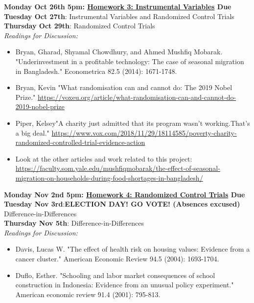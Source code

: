 \documentclass[a4paper, 10pt]{article}
\begin{document}
\noindent\textbf{Monday Oct 26th 5pm: \underline{Homework 3: Instrumental Variables} Due}\\

\noindent\textbf{Tuesday Oct 27th}: Instrumental Variables and Randomized Control Trials\\

\noindent\textbf{Thursday Oct 29th}:  Randomized Control Trials\\
\textit{Readings for Discussion:}
\begin{itemize}

\item Bryan, Gharad, Shyamal Chowdhury, and Ahmed Mushfiq Mobarak. "Underinvestment in a profitable technology: The case of seasonal migration in Bangladesh." Econometrica 82.5 (2014): 1671-1748.
\item Bryan, Kevin "What randomisation can and cannot do: The 2019 Nobel Prize." \href{ https://voxeu.org/article/what-randomisation-can-and-cannot-do-2019-nobel-prize}{ https://voxeu.org/article/what-randomisation-can-and-cannot-do-2019-nobel-prize}
\item Piper, Kelsey"A charity just admitted that its program wasn't working.That's a big deal." \href{ https://www.vox.com/2018/11/29/18114585/poverty-charity-randomized-controlled-trial-evidence-action}{ https://www.vox.com/2018/11/29/18114585/poverty-charity-randomized-controlled-trial-evidence-action}
\item Look at the other articles and work related to this project:\href{ https://faculty.som.yale.edu/mushfiqmobarak/the-effect-of-seasonal-migration-on-households-during-food-shortages-in-bangladesh/}{ https://faculty.som.yale.edu/mushfiqmobarak/the-effect-of-seasonal-migration-on-households-during-food-shortages-in-bangladesh/} 


\end{itemize}

\noindent\textbf{Monday Nov 2nd 5pm: \underline{Homework 4: Randomized Control Trials}  Due}\\

\noindent\textbf{Tuesday Nov 3rd}:\textbf{ELECTION DAY! GO VOTE! (Absences excused)} Difference-in-Differences\\

\noindent\textbf{Thursday Nov 5th}:  Difference-in-Differences\\
\textit{Readings for Discussion:}
\begin{itemize}
\item Davis, Lucas W. "The effect of health risk on housing values: Evidence from a cancer cluster." American Economic Review 94.5 (2004): 1693-1704. 
\item Duflo, Esther. "Schooling and labor market consequences of school construction in Indonesia: Evidence from an unusual policy experiment." American economic review 91.4 (2001): 795-813.
\end{itemize}
\end{document}
